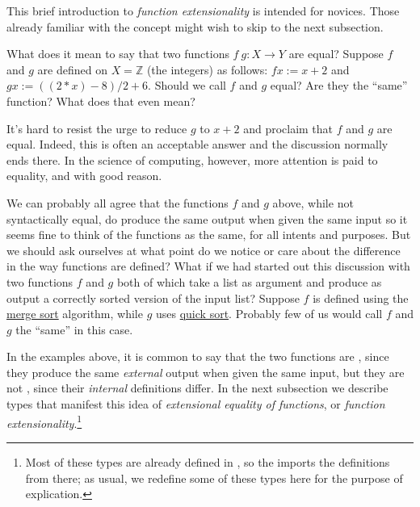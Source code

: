 This brief introduction to \emph{function extensionality} is intended for novices. Those already familiar with the concept might wish to skip to the next subsection.

What does it mean to say that two functions \(f\ g \colon X → Y\) are equal? Suppose $f$ and \(g\) are defined on \(X = ℤ\) (the integers) as follows: \(f x := x + 2\) and \(g x := ((2 * x) - 8)/2 + 6\). Should we call \(f\) and \(g\) equal?  Are they the ``same'' function?  What does that even mean?

It's hard to resist the urge to reduce \(g\) to \(x + 2\) and proclaim that \(f\) and \(g\) are equal. Indeed, this is often an acceptable answer and the discussion normally ends there.  In the science of computing, however, more attention is paid to equality, and with good reason.

We can probably all agree that the functions \(f\) and \(g\) above, while not syntactically equal, do produce the same output when given the same input so it seems fine to think of the functions as the same, for all intents and purposes. But we should ask ourselves at what point do we notice or care about the difference in the way functions are defined? What if we had started out this discussion with two functions \(f\) and \(g\) both of which take a list as argument and produce as output a correctly sorted version of the input list?  Suppose \(f\) is defined using the \href{https://en.wikipedia.org/wiki/Merge_sort}{merge sort} algorithm, while \(g\) uses \href{https://en.wikipedia.org/wiki/Quicksort}{quick sort}. Probably few of us would call \(f\) and \(g\) the ``same'' in this case.

In the examples above, it is common to say that the two functions are \href{https://en.wikipedia.org/wiki/Extensionality}{}, since they produce the same \emph{external} output when given the same input, but they are not \href{https://en.wikipedia.org/wiki/Intension}{}, since their \emph{internal} definitions differ. In the next subsection we describe types that manifest this idea of \emph{extensional equality of functions}, or \emph{function extensionality}.\footnote{Most of these types are already defined in \typtop, so the \ualib imports the definitions from there; as usual, we redefine some of these types here for the purpose of explication.}

